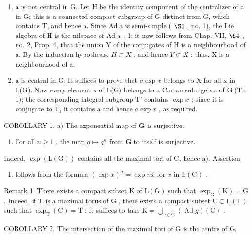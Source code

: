 \begin{enumerate}
\def\labelenumi{\arabic{enumi})}
\item
  a is not central in G. Let H be the identity component of the centralizer of a in G; this is a connected compact subgroup of G distinct from G, which contains T, and hence a. Since Ad a is semi-simple ( \(\S1\) , no. 1), the Lie algebra of H is the nilspace of Ad a - 1; it now follows from Chap. VII, \(\S4\) , no. 2, Prop. 4, that the union Y of the conjugates of H is a neighbourhood of a. By the induction hypothesis, \(H \subset X\) , and hence \(Y \subset X\) ; thus, X is a neighbourhood of a.
\item
  a is central in G. It suffices to prove that \(a \exp x\) belongs to X for all x in L(G). Now every element x of L(G) belongs to a Cartan subalgebra of G (Th. 1); the corresponding integral subgroup T' contains \(\exp x\) ; since it is conjugate to T, it contains a and hence \(a \exp x\) , as required.
\end{enumerate}

COROLLARY 1. a) The exponential map of \(\mathbf{G}\) is surjective.

\begin{enumerate}
\def\labelenumi{\alph{enumi})}
\setcounter{enumi}{1}
\tightlist
\item
  For all \(n \geq 1\) , the map \(g \mapsto g^n\) from \(\mathbf{G}\) to itself is surjective.
\end{enumerate}

Indeed, \(\exp(\mathrm{L}(\mathrm{G}))\) contains all the maximal tori of G, hence a). Assertion

\begin{enumerate}
\def\labelenumi{\alph{enumi})}
\setcounter{enumi}{1}
\tightlist
\item
  follows from the formula \((\exp x)^n = \exp nx\) for \(x\) in \(\mathrm{L}(\mathrm{G})\) .
\end{enumerate}

Remark 1. There exists a compact subset \(\mathrm{K}\) of \(\mathrm{L}(\mathrm{G})\) such that \(\exp_{\mathrm{G}}(\mathrm{K}) = \mathrm{G}\) . Indeed, if \(\mathrm{T}\) is a maximal torus of \(\mathrm{G}\) , there exists a compact subset \(\mathrm{C} \subset \mathrm{L}(\mathrm{T})\) such that \(\exp_{\mathrm{T}}(\mathrm{C}) = \mathrm{T}\) ; it suffices to take \(\mathrm{K} = \bigcup_{g \in \mathrm{G}} (\operatorname{Ad} g)(\mathrm{C})\) .

COROLLARY 2. The intersection of the maximal tori of G is the centre of G.

